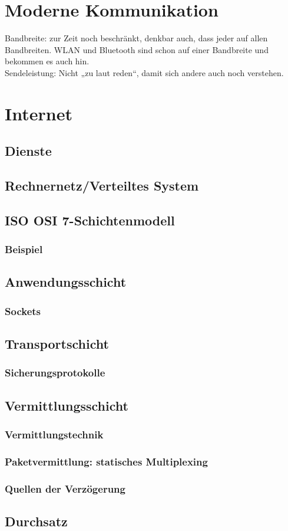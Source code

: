 \section{Moderne Kommunikation}
Bandbreite: zur Zeit noch beschränkt, denkbar auch, dass jeder auf allen Bandbreiten. WLAN und Bluetooth sind schon auf einer Bandbreite und bekommen es auch hin.\\
Sendeleistung: Nicht „zu laut reden“, damit sich andere auch noch verstehen.

\section{Internet}
\subsection{Dienste}
\subsection{Rechnernetz/Verteiltes System}
\subsection{ISO OSI 7-Schichtenmodell}
\subsubsection{Beispiel}
\subsection{Anwendungsschicht}
\subsubsection*{Sockets}
\subsection{Transportschicht}
\subsubsection*{Sicherungsprotokolle}
\subsection{Vermittlungsschicht}
\subsubsection*{Vermittlungstechnik}
\subsubsection*{Paketvermittlung: statisches Multiplexing}
\subsubsection*{Quellen der Verzögerung}
\subsection{Durchsatz}
